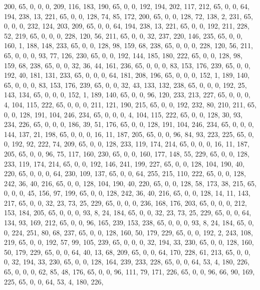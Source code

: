 \begin{DoxyCode}
       200, 65, 0, 0, 0, 209, 116, 183, 190, 65, 0, 0, 192, 194, 202, 117, 212, 65, 0, 0, 64, 194, 238, 13, 221, 65,
       0, 0, 128, 74, 85, 172, 200, 65, 0, 0, 128, 72, 138, 2, 231, 65, 0, 0, 0, 232, 124, 203, 209, 65, 0, 0, 64,
       194, 238, 13, 221, 65, 0, 0, 192, 211, 228, 52, 219, 65, 0, 0, 0, 228, 120, 56, 211, 65, 0, 0, 32, 237, 220,
       146, 235, 65, 0, 0, 160, 1, 188, 148, 233, 65, 0, 0, 128, 98, 159, 68, 238, 65, 0, 0, 0, 228, 120, 56, 211,
       65, 0, 0, 0, 93, 77, 126, 230, 65, 0, 0, 192, 144, 185, 180, 222, 65, 0, 0, 128, 98, 159, 68, 238, 65, 0, 0,
       32, 36, 44, 161, 236, 65, 0, 0, 0, 83, 153, 176, 239, 65, 0, 0, 192, 40, 181, 131, 233, 65, 0, 0, 0, 64,
       181, 208, 196, 65, 0, 0, 0, 152, 1, 189, 140, 65, 0, 0, 0, 83, 153, 176, 239, 65, 0, 0, 32, 43, 133, 132, 238,
       65, 0, 0, 0, 192, 25, 143, 134, 65, 0, 0, 0, 152, 1, 189, 140, 65, 0, 0, 96, 120, 233, 213, 227, 65, 0, 0,
       0, 4, 104, 115, 222, 65, 0, 0, 0, 211, 121, 190, 215, 65, 0, 0, 192, 232, 80, 210, 211, 65, 0, 0, 128, 191,
       104, 246, 234, 65, 0, 0, 0, 4, 104, 115, 222, 65, 0, 0, 128, 30, 93, 234, 226, 65, 0, 0, 0, 186, 39, 51,
       176, 65, 0, 0, 128, 191, 104, 246, 234, 65, 0, 0, 0, 144, 137, 21, 198, 65, 0, 0, 0, 16, 11, 187, 205, 65, 0,
       0, 96, 84, 93, 223, 225, 65, 0, 0, 192, 92, 222, 74, 209, 65, 0, 0, 128, 233, 119, 174, 214, 65, 0, 0, 0, 16,
       11, 187, 205, 65, 0, 0, 96, 75, 117, 160, 230, 65, 0, 0, 160, 177, 148, 55, 229, 65, 0, 0, 128, 233, 119,
       174, 214, 65, 0, 0, 192, 146, 241, 199, 227, 65, 0, 0, 128, 104, 190, 40, 220, 65, 0, 0, 0, 64, 230, 109,
       137, 65, 0, 0, 64, 255, 215, 110, 222, 65, 0, 0, 128, 242, 36, 40, 216, 65, 0, 0, 128, 104, 190, 40, 220, 65,
       0, 0, 128, 58, 173, 38, 215, 65, 0, 0, 0, 45, 156, 97, 199, 65, 0, 0, 128, 242, 36, 40, 216, 65, 0, 0, 128,
       14, 11, 143, 217, 65, 0, 0, 32, 23, 73, 25, 229, 65, 0, 0, 0, 236, 168, 176, 203, 65, 0, 0, 0, 212, 153, 184,
       205, 65, 0, 0, 0, 93, 8, 24, 184, 65, 0, 0, 32, 23, 73, 25, 229, 65, 0, 0, 64, 134, 93, 169, 212, 65, 0, 0,
       96, 165, 239, 153, 238, 65, 0, 0, 0, 93, 8, 24, 184, 65, 0, 0, 224, 251, 80, 68, 237, 65, 0, 0, 128, 160,
       50, 179, 229, 65, 0, 0, 192, 2, 243, 108, 219, 65, 0, 0, 192, 57, 99, 105, 239, 65, 0, 0, 0, 32, 194, 33,
       230, 65, 0, 0, 128, 160, 50, 179, 229, 65, 0, 0, 64, 40, 13, 68, 209, 65, 0, 0, 64, 170, 228, 61, 213, 65, 0,
       0, 0, 32, 194, 33, 230, 65, 0, 0, 128, 164, 239, 233, 228, 65, 0, 0, 64, 53, 4, 180, 226, 65, 0, 0, 0, 62,
       85, 48, 176, 65, 0, 0, 96, 111, 79, 171, 226, 65, 0, 0, 96, 66, 90, 169, 225, 65, 0, 0, 64, 53, 4, 180, 226,

\end{DoxyCode}
